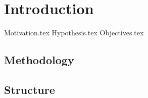 \chapter{Introduction}
\label{chap:introduction}
  {Motivation.tex}
  {Hypothesis.tex}
  {Objectives.tex}
  \section{Methodology}
  \label{sec:methodology}
    \Blindtext
  \section{Structure}
  \label{sec:structure}
    \Blindtext